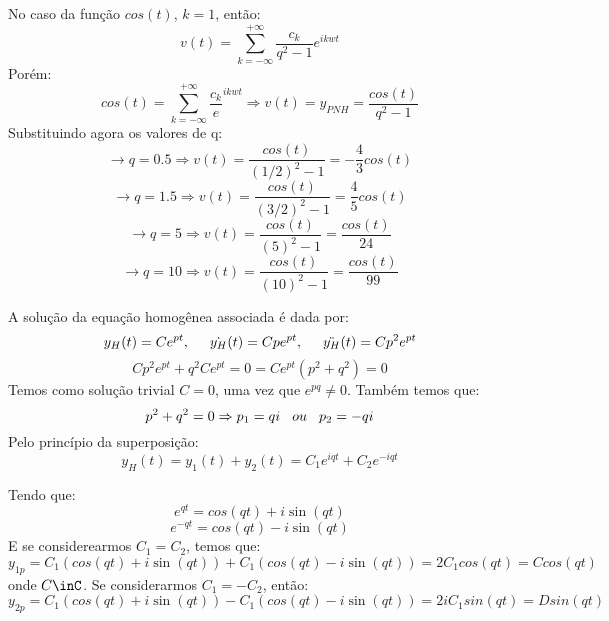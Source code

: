 No caso da função $cos(t)$, $k=1$, então:
\begin{equation*}
    v(t) = \sum^{+\infty}_{k=-\infty} \frac{c_k}{q^2 - 1}e^{ikwt}
\end{equation*}
Porém:
\begin{equation*}
    cos(t) = \sum^{+\infty}_{k=-\infty} \frac{c_k}e^{ikwt} \Rightarrow v(t) = y_{PNH}= \frac{cos(t)}{q^2-1}
\end{equation*}
Substituindo agora os valores de q:
\begin{equation*}
    \rightarrow{} q=0.5 \Rightarrow v(t) = \frac{cos(t)}{(1/2)^2 - 1} = -\frac{4}{3}cos(t)  
\end{equation*}
\begin{equation*}
    \rightarrow{} q = 1.5 \Rightarrow v(t) = \frac{cos(t)}{(3/2)^2 - 1 } = \frac{4}{5}cos(t)  
\end{equation*}
\begin{equation*}
    \rightarrow{} q=5 \Rightarrow v(t) = \frac{cos(t)}{(5)^2 - 1} = \frac{cos(t)}{24}  
\end{equation*}
\begin{equation*}
    \rightarrow{} q=10 \Rightarrow v(t) = \frac{cos(t)}{(10)^2 - 1} = \frac{cos(t)}{99}  
\end{equation*}

A solução da equação homogênea associada é dada por:
\begin{equation*}
    y_H(t) = Ce^{pt},\hspace{0.5cm}\dot{y_H}(t) = Cpe^{pt},\hspace{0.5cm} \ddot{y_H}(t) = Cp^2e^{pt}
\end{equation*}
\begin{equation*}
    Cp^2e^{pt} + q^2Ce^{pt} = 0 = Ce^{pt}(p^2+ q^2) = 0
\end{equation*}
Temos como solução trivial $\boxed{C=0}$, uma vez que $e^{pq}\neq0$. Também temos que:
\begin{equation*}
    p^2+q^2 = 0 \Rightarrow p_1=qi \hspace{0.3cm}ou \hspace{0.3cm} p_2=-qi
\end{equation*}
Pelo princípio da superposição:
\begin{equation*}
    y_H(t) = y_1(t) + y_2(t) = C_1e^{iqt} + C_2e^{-iqt}
\end{equation*}

Tendo que:
\begin{equation*}
    e^{qt} = cos(qt) + i\sin(qt)
\end{equation*}
\begin{equation*}
    e^{-qt} = cos(qt) - i\sin(qt)
\end{equation*}
E se considerearmos $C_1 = C_2$, temos que:
\begin{equation*}
    y_{1p} = C_1(cos(qt) + i\sin(qt)) + C_1(cos(qt) - i\sin(qt)) = 2C_1cos(qt) = Ccos(qt)
\end{equation*}
onde $C\inC$.
Se considerarmos $C_1 = -C_2$, então:
\begin{equation*}
    y_{2p} = C_1(cos(qt) + i\sin(qt)) - C_1(cos(qt) - i\sin(qt)) = 2iC_1sin(qt) = Dsin(qt)
\end{equation*}

